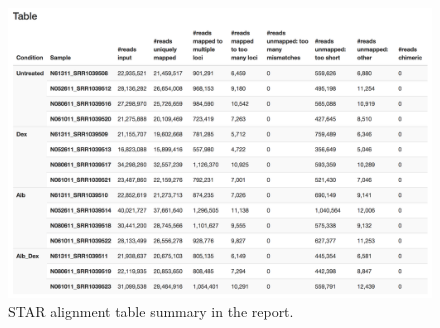 \begin{figure}[!tb]
\centering
\includegraphics[width=1\textwidth]{images/report_align_table_num_read}
\caption[STAR alignment table in summary report]{
    STAR alignment table summary in the report.
}
\label{fig:report-align-table}
\end{figure}

